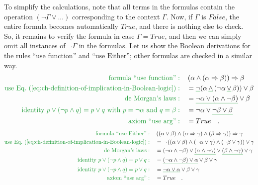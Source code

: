 To simplify the calculations, note that all terms in the formulas
contain the operation $\left(\neg\Gamma\vee...\right)$ corresponding
to the context $\Gamma$. Now, if $\Gamma$ is $False$, the entire
formula becomes automatically $True$, and there is nothing else to
check. So, it remains to verify the formula in case $\Gamma=True$,
and then we can simply omit all instances of $\neg\Gamma$ in the
formulas. Let us show the Boolean derivations for the rules ``$\text{use function}$''
and ``$\text{use Either}$''; other formulas are checked in a similar
way. 
\begin{align*}
{\color{greenunder}\text{formula ``use function''}:}\quad & \left(\alpha\wedge\left(\alpha\Rightarrow\beta\right)\right)\Rightarrow\beta\\
{\color{greenunder}\text{use Eq.~(\ref{eq:ch-definition-of-implication-in-Boolean-logic})}:}\quad & =\gunderline{\neg}(\alpha\,\gunderline{\wedge}\,(\neg\alpha\,\gunderline{\vee}\,\beta))\vee\beta\\
{\color{greenunder}\text{de Morgan's laws}:}\quad & =\gunderline{\neg\alpha\vee(\alpha\wedge\neg\beta)}\vee\beta\\
{\color{greenunder}\text{identity }p\vee(\neg p\wedge q)=p\vee q\text{ with }p=\neg\alpha\text{ and }q=\beta:}\quad & =\neg\alpha\vee\gunderline{\neg\beta\vee\beta}\\
{\color{greenunder}\text{axiom ``use arg''}:}\quad & =True\quad.
\end{align*}
\begin{align*}
{\color{greenunder}\text{formula ``use Either''}:}\quad & \left(\left(\alpha\vee\beta\right)\wedge\left(\alpha\Rightarrow\gamma\right)\wedge\left(\beta\Rightarrow\gamma\right)\right)\Rightarrow\gamma\\
{\color{greenunder}\text{use Eq.~(\ref{eq:ch-definition-of-implication-in-Boolean-logic})}:}\quad & =\neg\left(\left(\alpha\vee\beta\right)\wedge\left(\neg\alpha\vee\gamma\right)\wedge\left(\neg\beta\vee\gamma\right)\right)\vee\gamma\\
{\color{greenunder}\text{de Morgan's laws}:}\quad & =\left(\neg\alpha\wedge\neg\beta\right)\vee\gunderline{\left(\alpha\wedge\neg\gamma\right)}\vee\gunderline{\left(\beta\wedge\neg\gamma\right)}\vee\gamma\\
{\color{greenunder}\text{identity }p\vee(\neg p\wedge q)=p\vee q:}\quad & =\gunderline{\left(\neg\alpha\wedge\neg\beta\right)\vee\alpha}\vee\beta\vee\gamma\\
{\color{greenunder}\text{identity }p\vee(\neg p\wedge q)=p\vee q:}\quad & =\gunderline{\neg\alpha\vee\alpha}\vee\beta\vee\gamma\\
{\color{greenunder}\text{axiom ``use arg''}:}\quad & =True\quad.
\end{align*}
